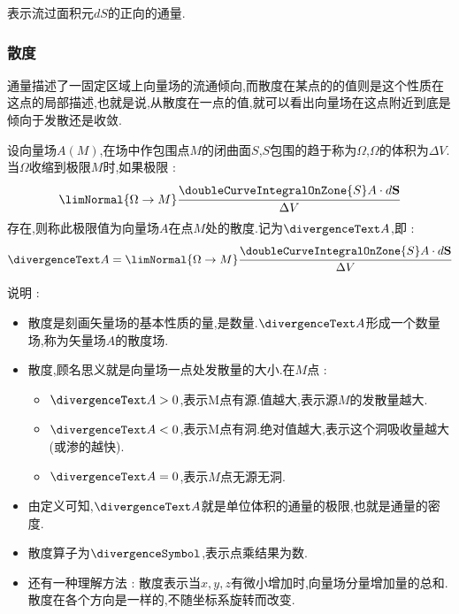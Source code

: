 {{{{\begin{itemize}
{              表示流过面积元$dS$的正向的通量.
              }
      \end{itemize}
    }%

    \subsubsection{散度}{
      通量描述了一固定区域上向量场的流通倾向,而散度在某点的的值则是这个性质在这点的局部描述,也就是说,从散度在一点的值,就可以看出向量场在这点附近到底是倾向于发散还是收敛.

      设向量场$A(M)$,在场中作包围点$M$的闭曲面$S$,$S$包围的趋于称为$\Omega$,$\Omega$的体积为$\Delta V$.当$\Omega$收缩到极限$M$时,如果极限 :
      $$
        \limNormal{\Omega \to M}\cfrac{\doubleCurveIntegralOnZone{S}A \cdot d\mathbf{S}}{\Delta V}
      $$
      存在,则称此极限值为向量场$A$在点$M$处的散度.记为$\divergenceText A$,即 :
      $$
        \divergenceText A = \limNormal{\Omega \to M}\cfrac{\doubleCurveIntegralOnZone{S}A \cdot d\mathbf{S}}{\Delta V}
      $$

      说明 :
      \begin{itemize}
        \item {
              散度是刻画矢量场的基本性质的量,是数量.$\divergenceText A$形成一个数量场,称为矢量场$A$的散度场.
              }
        \item {
              散度,顾名思义就是向量场一点处发散量的大小.在$M$点 :
              \begin{itemize}
                \item $\divergenceText A > 0$,表示M点有源.值越大,表示源$M$的发散量越大.
                \item $\divergenceText A < 0$,表示M点有洞.绝对值越大,表示这个洞吸收量越大(或渗的越快).
                \item $\divergenceText A = 0$,表示$M$点无源无洞.
              \end{itemize}
              }
        \item {
              由定义可知,$\divergenceText A$就是单位体积的通量的极限,也就是通量的密度.
              }
        \item {
              散度算子为$\divergenceSymbol$,表示点乘结果为数.
              }
        \item {
              还有一种理解方法 : 散度表示当$x,y,z$有微小增加时,向量场分量增加量的总和.散度在各个方向是一样的,不随坐标系旋转而改变.
              }
      \end{itemize}
    }%

}}}
